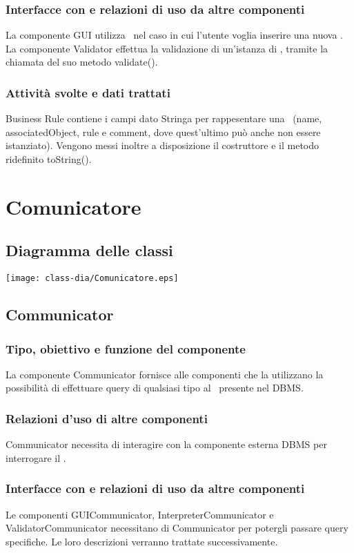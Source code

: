 \subsubsection{Interfacce con e relazioni di uso da altre componenti}
La componente GUI utilizza \BR\ nel caso in cui l'utente voglia inserire una nuova \br.
La componente Validator effettua la validazione di un'istanza di \BR, tramite la chiamata del suo metodo validate().
\subsubsection{Attivit\`a svolte e dati trattati}
Business Rule contiene i campi dato Stringa per rappesentare una \br\ (name, associatedObject, rule e comment, dove quest'ultimo pu\`o anche non essere istanziato). Vengono messi inoltre a disposizione il costruttore e il metodo ridefinito toString().

\section{Comunicatore}
\subsection{Diagramma delle classi}
\begin{center}
\texttt{[image: class-dia/Comunicatore.eps]}
\end{center}
\subsection{Communicator}
\subsubsection{Tipo, obiettivo e funzione del componente}
La componente Communicator fornisce alle componenti che la utilizzano la possibilit\`a di effettuare query di qualsiasi tipo al \rp\ presente nel DBMS.
\subsubsection{Relazioni d'uso di altre componenti}
Communicator necessita di interagire con la componente esterna DBMS per interrogare il \rp.
\subsubsection{Interfacce con e relazioni di uso da altre componenti}
Le componenti GUICommunicator, InterpreterCommunicator e ValidatorCommunicator necessitano di Communicator per potergli passare query specifiche. Le loro descrizioni verranno trattate successivamente.

